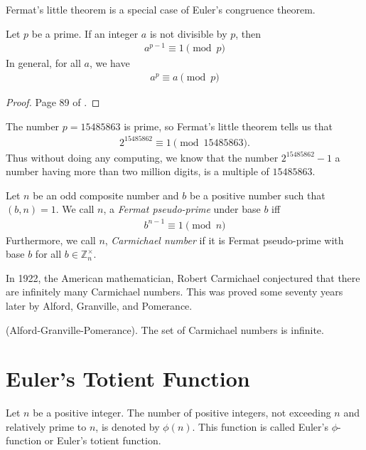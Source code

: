 \documentclass[a4paper, 12pt]{book} %
\begin{document}
Fermat's little theorem is a special case of Euler's congruence theorem.
\begin{theorem}
    Let $p$ be a prime. If an integer $a$ is not divisible by $p$, then 
    \begin{align}
        a^{p-1} \equiv 1 \pmod p
    \end{align}
    In general, for all $a$, we have
    \begin{align}
        a^p \equiv a \pmod p
    \end{align} 
\end{theorem}
\begin{proof}
Page 89 of \cite{rubinstein2018cryptography}.
\end{proof}

\begin{example}
    The number $p = 15485863$ is prime, so Fermat's little theorem tells us that
    \begin{align}
        2^{15485862} \equiv 1 \pmod{15485863}.
    \end{align}
    Thus without doing any computing, we know that the number $2^{15485862}-1$ a number having more than two million digits, is a multiple of $15485863$.
\end{example}

\begin{definition}
   Let $n$ be an odd composite number and $b$ be a positive number such that $(b, n) = 1$. We call $n$, a \emph{Fermat pseudo-prime} under base $b$ iff 
   \begin{align}
    b^{n-1} \equiv 1 \pmod n
   \end{align} 
   Furthermore, we call $n$, \emph{Carmichael number} if it is Fermat pseudo-prime with base $b$ for all $b \in \mathbb{Z}_n^\times$.
\end{definition}


In 1922, the American mathematician, Robert Carmichael conjectured that
there are infinitely many Carmichael numbers. This was proved some seventy
years later by Alford, Granville, and Pomerance.

\begin{theorem}
    (Alford-Granville-Pomerance). The set of Carmichael numbers is infinite.
\end{theorem}



\section{Euler's Totient Function}
\begin{definition}
    Let $n$ be a positive integer. The number of positive integers, not exceeding $n$ and relatively prime to $n$, is denoted by $\phi(n)$. This function is called Euler's $\phi$-function or Euler's totient function.
\end{definition}
\end{document}
